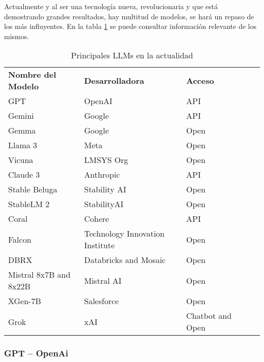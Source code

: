 Actualmente y al ser una tecnología nueva, revolucionaria y que está demostrando grandes resultados, hay multitud de modelos, se hará un repaso de los más influyentes. En la tabla \ref{tab:tablellm} se puede consultar información relevante de los mismos.

\begin{table}[]
\begin{tabular}{lllll}
\textbf{Nombre del Modelo}     & \textbf{Desarrolladora}                & \textbf{Acceso}           &  &  \\
GPT                     & OpenAI                          & API              &  &  \\
Gemini                  & Google                          & API              &  &  \\
Gemma                   & Google                          & Open             &  &  \\
Llama 3                 & Meta                            & Open             &  &  \\
Vicuna                  & LMSYS Org                       & Open             &  &  \\
Claude 3                & Anthropic                       & API              &  &  \\
Stable Beluga           & Stability AI                    & Open             &  &  \\
StableLM 2              & StabilityAI                     & Open             &  &  \\
Coral                   & Cohere                          & API              &  &  \\
Falcon                  & Technology Innovation Institute & Open             &  &  \\
DBRX                    & Databricks and Mosaic           & Open             &  &  \\
Mistral 8x7B and  8x22B & Mistral AI                      & Open             &  &  \\
XGen-7B                 & Salesforce                      & Open             &  &  \\
Grok                    & xAI                             & Chatbot and Open &  & 
\end{tabular}
\caption{Principales LLMs en la actualidad}
\label{tab:tablellm}
\end{table}

\subsubsection{GPT – OpenAi}

